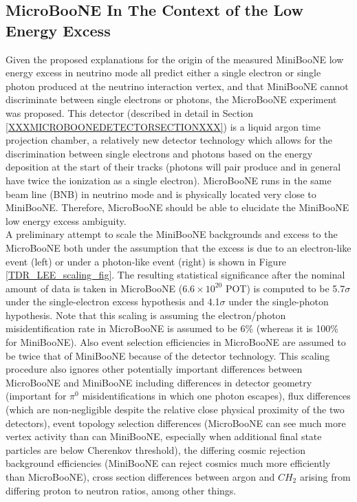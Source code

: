 \subsection{MicroBooNE In The Context of the Low Energy Excess}

Given the proposed explanations for the origin of the measured MiniBooNE low energy excess in neutrino mode all predict either a single electron or single photon produced at the neutrino interaction vertex, and that MiniBooNE cannot discriminate between single electrons or photons, the MicroBooNE experiment was proposed. This detector (described in detail in Section \ref{XXXMICROBOONEDETECTORSECTIONXXX}) is a liquid argon time projection chamber, a relatively new detector technology which allows for the discrimination between single electrons and photons based on the energy deposition at the start of their tracks (photons will pair produce and in general have twice the ionization as a single electron). MicroBooNE runs in the same beam line (BNB) in neutrino mode and is physically located very close to MiniBooNE. Therefore, MicroBooNE should be able to elucidate the MiniBooNE low energy excess ambiguity. \\

A preliminary attempt to scale the MiniBooNE backgrounds and excess to the MicroBooNE both under the assumption that the excess is due to an electron-like event (left) or under a photon-like event (right) \cite{UBTDR} is shown in Figure \ref{TDR_LEE_scaling_fig}. The resulting statistical significance after the nominal amount of data is taken in MicroBooNE ($6.6\times 10^20$ POT) is computed to be 5.7$\sigma$ under the single-electron excess hypothesis and 4.1$\sigma$ under the single-photon hypothesis. Note that this scaling is assuming the electron/photon misidentification rate in MicroBooNE is assumed to be 6\% (whereas it is 100\% for MiniBooNE). Also event selection efficiencies in MicroBooNE are assumed to be twice that of MiniBooNE because of the detector technology. This scaling procedure also ignores other potentially important differences between MicroBooNE and MiniBooNE including differences in detector geometry (important for $\pi^0$ misidentifications in which one photon escapes), flux differences (which are non-negligible despite the relative close physical proximity of the two detectors), event topology selection differences (MicroBooNE can see much more vertex activity than can MiniBooNE, especially when additional final state particles are below Cherenkov threshold), the differing cosmic rejection background efficiencies (MiniBooNE can reject cosmics much more efficiently than MicroBooNE), cross section differences between argon and $CH_2$ arising from differing proton to neutron ratios, among other things.\\

